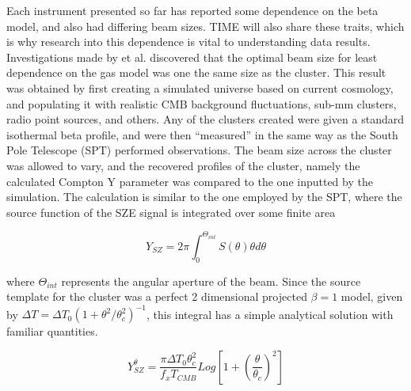 \documentclass[manuscript]{aastex}
\begin{document}
Each instrument presented so far has reported some dependence on the beta model, and also had differing beam sizes. TIME will also share these traits, which is why research into this dependence is vital to understanding data results. Investigations made by \cite{Saliwanchick2015} et al. discovered that the optimal beam size for least dependence on the gas model was one the same size as the cluster. This result was obtained by first creating a simulated universe based on current cosmology, and populating it with realistic CMB background fluctuations, sub-mm clusters, radio point sources, and others. Any of the clusters created were given a standard isothermal beta profile, and were then ``measured'' in the same way as the South Pole Telescope (SPT) performed observations. The beam size across the cluster was allowed to vary, and the recovered profiles of the cluster, namely the calculated Compton Y parameter was compared to the one inputted by the simulation. The calculation is similar to the one employed by the SPT, where the source function of the SZE signal is integrated over some finite area

\begin{equation}
Y_{SZ} = 2\pi \int_{0}^{\Theta_{int}} S(\theta) \theta d\theta
\end{equation}

where $\Theta_{int}$ represents the angular aperture of the beam. Since the source template for the cluster was a perfect 2 dimensional projected $\beta = 1$ model, given by $\Delta T = \Delta T_{0}(1 + \theta^{2}/\theta_{c}^{2})^{-1}$, this integral has a simple analytical solution with familiar quantities. 

\begin{equation}
Y_{SZ}^{\theta} = \frac{\pi \Delta T_{0} \theta_{c}^{2}}{f_{x} T_{CMB}} Log[1 + (\frac{\theta}{\theta_{c}})^{2}]
\end{equation}
\end{document}
